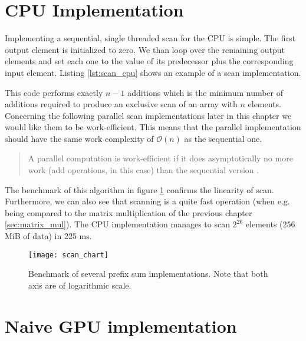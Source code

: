 \section{CPU Implementation}
\label{sec:scan_cpu}

Implementing a sequential, single threaded scan for the CPU is simple. The first output element is initialized to zero. We than loop over the remaining output elements and set each one to the value of its predecessor plus the corresponding input element. Listing \ref{lst:scan_cpu} shows an example of a scan implementation.



This code performs exactly $n - 1$ additions which is the minimum number of additions required to produce an exclusive scan of an array with $n$ elements. Concerning the following parallel scan implementations later in this chapter we would like them to be work-efficient. This means that the parallel implementation should have the same work complexity of $\mathcal{O}(n)$ as the sequential one.

\begin{quote}
A parallel computation is work-efficient if it does asymptotically no more work (add operations, in this case) than the sequential version \cite{gpu_gems_3_chapter_39}.
\end{quote}

The benchmark of this algorithm in figure \ref{fig:scan_chart} confirms the linearity of scan. Furthermore, we can also see that scanning is a quite fast operation (when e.g. being compared to the matrix multiplication of the previous chapter \ref{sec:matrix_mul}). The CPU implementation manages to scan $2^{26}$ elements (256 MiB of data) in 225 ms.

\begin{figure}
\centering
\texttt{[image: scan\_chart]}
\caption{Benchmark of several prefix sum implementations.
Note that both axis are of logarithmic scale.}
\label{fig:scan_chart}
\end{figure}

\section{Naive GPU implementation}
\label{sec:scan_naive}

